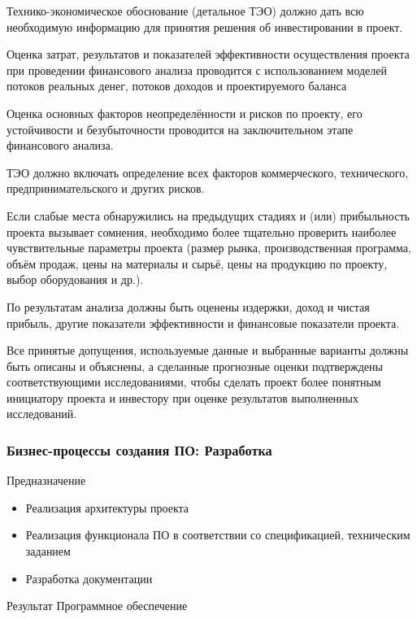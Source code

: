 \documentclass{../industrial-development}
\begin{document}
\lecturenotes

Технико-экономическое обоснование (детальное ТЭО) должно дать всю необходимую информацию для принятия решения об инвестировании в проект. 

Оценка затрат, результатов и показателей эффективности осуществления проекта при проведении финансового анализа проводится с использованием моделей потоков реальных денег, потоков доходов и проектируемого баланса

Оценка основных факторов неопределённости и рисков по проекту, его устойчивости и безубыточности проводится на заключительном этапе финансового анализа.

ТЭО должно включать определение всех факторов коммерческого, технического, предпринимательского и других рисков.

Если слабые места обнаружились на предыдущих стадиях и (или) прибыльность проекта вызывает сомнения, необходимо более тщательно проверить наиболее чувствительные параметры проекта (размер рынка, производственная программа, объём продаж, цены на материалы и сырьё, цены на продукцию по проекту, выбор оборудования и др.).

По результатам анализа должны быть оценены издержки, доход и чистая прибыль, другие показатели эффективности и финансовые показатели проекта.

Все принятые допущения, используемые данные и выбранные варианты должны быть описаны и объяснены, а сделанные прогнозные оценки подтверждены соответствующими исследованиями, чтобы сделать проект более понятным инициатору проекта и инвестору при оценке результатов выполненных исследований.


\begin{frame} \frametitle{Бизнес-процессы создания ПО: Разработка}
	\begin{block}{Предназначение}
		\begin{itemize}
			\item Реализация архитектуры проекта
			\item Реализация функционала ПО в соответствии со спецификацией, техническим заданием
			\item Разработка документации
		\end{itemize}
	\end{block}
	\begin{block}{Результат}
		Программное обеспечение
	\end{block}
\end{frame}

\lecturenotes
\end{document}
